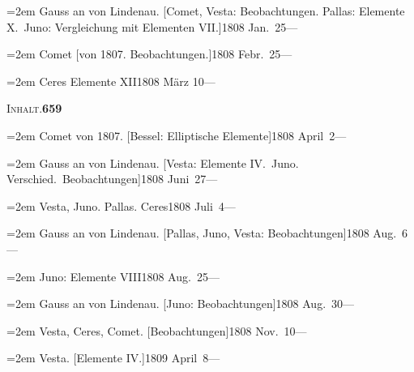 \documentclass[12pt,a4paper]{article}
\begin{document}
{{{{\vspace{0.5mm}
\noindent\hangindent=2em
Gauss an von Lindenau. [Comet, Vesta: Beobachtungen. Pallas: Elemente X.\ Juno: Vergleichung mit Elementen VII.]\hfill 1808 Jan.\ 25\quad ---

\vspace{0.5mm}
\noindent\hangindent=2em
Comet [von 1807. Beobachtungen.]\hfill 1808 Febr.\ 25\quad ---

\vspace{0.5mm}
\noindent\hangindent=2em
Ceres Elemente XII\hfill 1808 M\"arz 10\quad ---

\newpage

\begin{center}\small\textsc{Inhalt.}\quad\textbf{659}\end{center}

\vspace{0.3cm}

{\small
\noindent\hangindent=2em
Comet von 1807. [Bessel: Elliptische Elemente]\hfill 1808 April\ 2\quad ---

\vspace{0.5mm}
\noindent\hangindent=2em
Gauss an von Lindenau. [Vesta: Elemente IV.\ Juno. Verschied.\ Beobachtungen]\hfill 1808 Juni\ 27\quad ---

\vspace{0.5mm}
\noindent\hangindent=2em
Vesta, Juno. Pallas. Ceres\hfill 1808 Juli\ 4\quad ---

\vspace{0.5mm}
\noindent\hangindent=2em
Gauss an von Lindenau. [Pallas, Juno, Vesta: Beobachtungen]\hfill 1808 Aug.\ 6\quad ---

\vspace{0.5mm}
\noindent\hangindent=2em
Juno: Elemente VIII\hfill 1808 Aug.\ 25\quad ---

\vspace{0.5mm}
\noindent\hangindent=2em
Gauss an von Lindenau. [Juno: Beobachtungen]\hfill 1808 Aug.\ 30\quad ---

\vspace{0.5mm}
\noindent\hangindent=2em
Vesta, Ceres, Comet. [Beobachtungen]\hfill 1808 Nov.\ 10\quad ---

\vspace{0.5mm}
\noindent\hangindent=2em
Vesta. [Elemente IV.]\hfill 1809 April\ 8\quad ---

}}}}}
\end{document}
